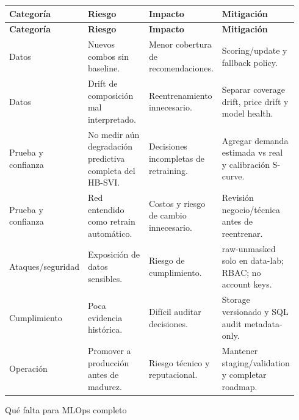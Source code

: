 \documentclass[11pt,letterpaper]{article}
\makeatletter
\renewcommand\section{\@startsection{section}{1}{\z@}
  {-3.5ex \@plus -1ex \@minus -.2ex}
  {2.3ex \@plus .2ex}
  {\Large\bfseries\sffamily\color{azulTec}}}
\makeatother
\begin{document}
\begin{longtable}{L{0.22\linewidth}L{0.27\linewidth}L{0.25\linewidth}L{0.20\linewidth}}
\toprule
\textbf{Categoría} & \textbf{Riesgo} & \textbf{Impacto} & \textbf{Mitigación} \\
\midrule
\endfirsthead
\toprule
\textbf{Categoría} & \textbf{Riesgo} & \textbf{Impacto} & \textbf{Mitigación} \\
\midrule
\endhead
Datos & Nuevos combos sin baseline. & Menor cobertura de recomendaciones. & Scoring/update y fallback policy. \\
Datos & Drift de composición mal interpretado. & Reentrenamiento innecesario. & Separar coverage drift, price drift y model health. \\
Prueba y confianza & No medir aún degradación predictiva completa del HB-SVI. & Decisiones incompletas de retraining. & Agregar demanda estimada vs real y calibración S-curve. \\
Prueba y confianza & Red entendido como retrain automático. & Costos y riesgo de cambio innecesario. & Revisión negocio/técnica antes de reentrenar. \\
Ataques/seguridad & Exposición de datos sensibles. & Riesgo de cumplimiento. & raw-unmasked solo en data-lab; RBAC; no account keys. \\
Cumplimiento & Poca evidencia histórica. & Difícil auditar decisiones. & Storage versionado y SQL audit metadata-only. \\
Operación & Promover a producción antes de madurez. & Riesgo técnico y reputacional. & Mantener staging/validation y completar roadmap. \\
\bottomrule
\end{longtable}

\section{Qué falta para MLOps completo}
\end{document}
